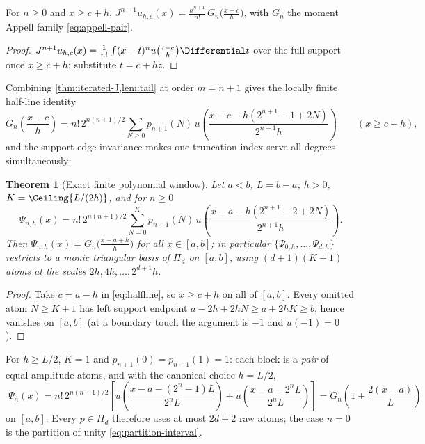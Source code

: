 \documentclass[11pt,oneside]{article}
\numberwithin{equation}{section}
\newtheorem{theorem}{Theorem}[section]
\theoremstyle{definition}
\theoremstyle{remark}
\newcommand{\PiD}{\Pi_d}
\begin{document}
\begin{lemma}
\label{lem:tail}
For $n\ge0$ and $x\ge c+h$,
$J^{n+1}u_{h,c}(x)=\frac{h^{n+1}}{n!}\,
G_n\!\bigl(\frac{x-c}{h}\bigr)$, with $G_n$ the moment Appell family
\eqref{eq:appell-pair}.
\end{lemma}

\begin{proof}
$J^{n+1}u_{h,c}(x)=\frac1{n!}\int(x-t)^{n}u\bigl(\tfrac{t-c}h\bigr)
\Differential t$ over the full support once $x\ge c+h$; substitute $t=c+hz$.
\end{proof}

Combining \cref{thm:iterated-J,lem:tail} at order $m=n+1$ gives the
locally finite half-line identity
\begin{equation}
 G_n\!\left(\frac{x-c}{h}\right)
 =n!\,2^{n(n+1)/2}\sum_{N\ge0}p_{n+1}(N)\,
 u\!\left(\frac{x-c-h(2^{n+1}-1+2N)}{2^{n+1}h}\right)
 \qquad(x\ge c+h),
 \label{eq:halfline}
\end{equation}
and the support-edge invariance makes one truncation index serve all
degrees simultaneously:

\begin{theorem}[Exact finite polynomial window]
\label{thm:finite-window}
Let $a<b$, $L=b-a$, $h>0$, $K=\Ceiling{L/(2h)}$, and for $n\ge0$
\begin{equation}
 \boxed{\;
 \Psi_{n,h}(x)
 =n!\,2^{n(n+1)/2}
 \sum_{N=0}^{K}p_{n+1}(N)\,
 u\!\left(\frac{x-a-h(2^{n+1}-2+2N)}{2^{n+1}h}\right).
 \;}
 \label{eq:finite-Psi-def}
\end{equation}
Then $\Psi_{n,h}(x)=G_n\bigl(\tfrac{x-a+h}h\bigr)$ for all
$x\in[a,b]$; in particular
$\{\Psi_{0,h},\dots,\Psi_{d,h}\}$ restricts to a monic triangular
basis of $\PiD$ on $[a,b]$, using $(d+1)(K+1)$ atoms at the scales
$2h,4h,\dots,2^{d+1}h$.
\end{theorem}

\begin{proof}
Take $c=a-h$ in \eqref{eq:halfline}, so $x\ge c+h$ on all of
$[a,b]$.  Every omitted atom $N\ge K+1$ has left support endpoint
$a-2h+2hN\ge a+2hK\ge b$, hence vanishes on $[a,b]$ (at a boundary
touch the argument is $-1$ and $u(-1)=0$).
\end{proof}

\begin{corollary}
\label{cor:two-atom}
For $h\ge L/2$, $K=1$ and $p_{n+1}(0)=p_{n+1}(1)=1$: each block is a
\emph{pair} of equal-amplitude atoms, and with the canonical choice
$h=L/2$,
\begin{equation}
 \boxed{\;
 \Psi_n(x)
 =n!\,2^{n(n+1)/2}\left[
 u\!\left(\frac{x-a-(2^{n}-1)L}{2^{n}L}\right)
 +u\!\left(\frac{x-a-2^{n}L}{2^{n}L}\right)
 \right]
 =G_n\!\left(1+\frac{2(x-a)}{L}\right)
 \;}
 \label{eq:canonical-Psi}
\end{equation}
on $[a,b]$.  Every $p\in\PiD$ therefore uses at most $2d+2$ raw
atoms; the case $n=0$ is the partition of unity
\eqref{eq:partition-interval}.
\end{corollary}
\end{document}
